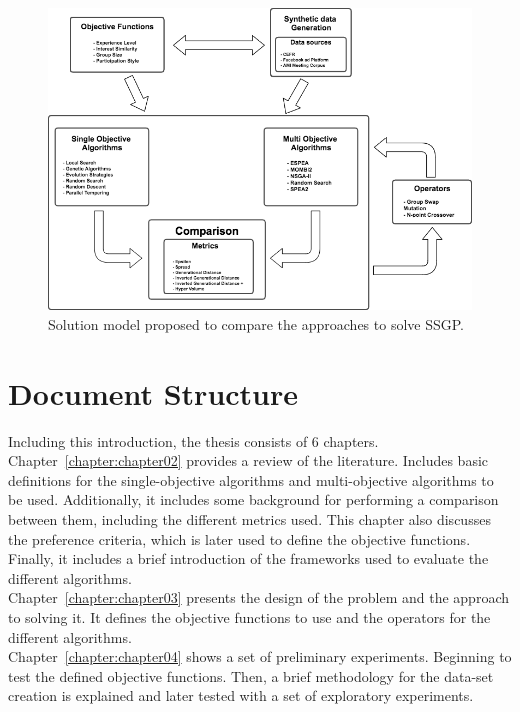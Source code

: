 \begin{figure}[H]
    \centering
    \includegraphics[width=\textwidth]{images/solution_model.png}
    \caption{Solution model proposed to compare the approaches to solve SSGP.}
    \label{fig:solution_model}
\end{figure}

\section{Document Structure}

Including this introduction, the thesis consists of 6 chapters. \\

Chapter~\ref{chapter:chapter02} provides a review of the literature. Includes basic definitions for the single-objective algorithms and multi-objective algorithms to be used. Additionally, it includes some background for performing a comparison between them, including the different metrics used. This chapter also discusses the preference criteria, which is later used to define the objective functions. Finally, it includes a brief introduction of the frameworks used to evaluate the different algorithms. \\

Chapter~\ref{chapter:chapter03} presents the design of the problem and the approach to solving it. It defines the objective functions to use and the operators for the different algorithms. \\

Chapter~\ref{chapter:chapter04} shows a set of preliminary experiments. Beginning to test the defined objective functions. Then, a brief methodology for the data-set creation is explained and later tested with a set of exploratory experiments. \\

